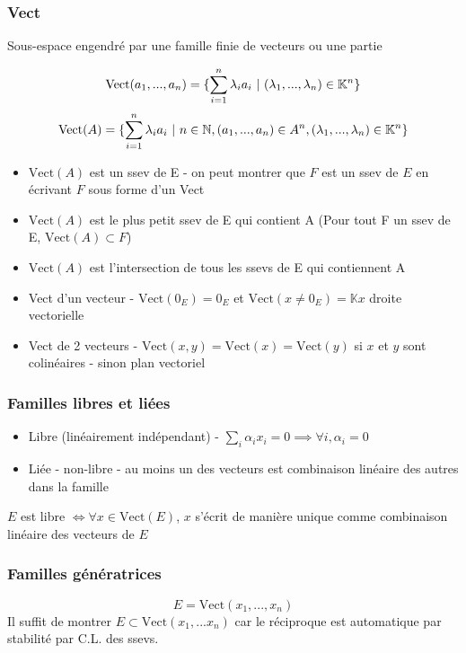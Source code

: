 \documentclass[openany]{book}
\begin{document}
\subsubsection{Vect}
Sous-espace engendré par une famille finie de vecteurs ou une partie

\[ \text{Vect}(a_1,...,a_n) = \{\sum_{i=1}^n \lambda_i a_i \text{ } | \text{ } (\lambda_1,...,\lambda_n) \in \mathbb{K}^n \} \]
\[ \text{Vect}(A) = \{\sum_{i=1}^n \lambda_i a_i \text{ } | \text{ } n \in \mathbb{N}, (a_1,...,a_n) \in A^n, (\lambda_1,...,\lambda_n) \in \mathbb{K}^n \} \]

\begin{itemize}
    \item $\text{Vect}(A)$ est un ssev de E - on peut montrer que $F$ est un ssev de $E$ en écrivant $F$ sous forme d'un Vect
    \item $\text{Vect}(A)$ est le plus petit ssev de E qui contient A (Pour tout F un ssev de E, $ \text{Vect}(A) \subset F $) 
    \item $\text{Vect}(A)$ est l'intersection de tous les ssevs de E qui contiennent A 
    \item Vect d'un vecteur - $ \text{Vect}(0_E) = {0_E} $ et $ \text{Vect}(x \neq 0_E) = \mathbb{K}x $ droite vectorielle
    \item Vect de 2 vecteurs - $ \text{Vect}(x, y) = \text{Vect}(x) = \text{Vect}(y) $ si $x$ et $y$ sont colinéaires - sinon plan vectoriel
\end{itemize}

\subsubsection{Familles libres et liées}
\begin{itemize}
    \item Libre (linéairement indépendant) - $ \sum_i \alpha_ix_i = 0 \implies \forall i, \alpha_i = 0 $
    \item Liée - non-libre  - au moins un des vecteurs est combinaison linéaire des autres dans la famille
\end{itemize}

\noindent $E$ est libre $\iff \forall x \in \text{Vect}(E)$, $x$ s'écrit de manière unique comme combinaison linéaire des vecteurs de $E$

\subsubsection{Familles génératrices}
\[ E = \text{Vect}(x_1,...,x_n) \]
\noindent Il suffit de montrer $ E \subset \text{Vect}(x_1,...x_n) $ car le réciproque est automatique par stabilité par C.L. des ssevs. \\
\end{document}
